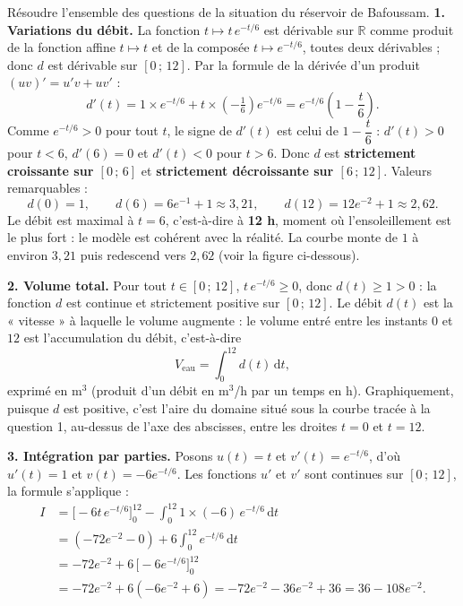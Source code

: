 \documentclass[11pt]{article}
\begin{document}
\begin{exoresolu}
Résoudre l'ensemble des questions de la situation du réservoir de Bafoussam.
\tcblower
\textbf{1. Variations du débit.} La fonction $t \mapsto t\,e^{-t/6}$ est dérivable sur $\mathbb{R}$ comme produit de la fonction affine $t \mapsto t$ et de la composée $t \mapsto e^{-t/6}$, toutes deux dérivables ; donc $d$ est dérivable sur $[0\,;\,12]$. Par la formule de la dérivée d'un produit $(uv)' = u'v + uv'$ :
\[ d'(t) = 1 \times e^{-t/6} + t \times \left(-\tfrac{1}{6}\right)e^{-t/6} = e^{-t/6}\left(1 - \frac{t}{6}\right). \]
Comme $e^{-t/6} > 0$ pour tout $t$, le signe de $d'(t)$ est celui de $1 - \dfrac{t}{6}$ : $d'(t) > 0$ pour $t < 6$, $d'(6) = 0$ et $d'(t) < 0$ pour $t > 6$. Donc $d$ est \textbf{strictement croissante sur $[0\,;\,6]$} et \textbf{strictement décroissante sur $[6\,;\,12]$}. Valeurs remarquables :
\[ d(0) = 1, \qquad d(6) = 6e^{-1} + 1 \approx 3{,}21, \qquad d(12) = 12e^{-2} + 1 \approx 2{,}62. \]
Le débit est maximal à $t = 6$, c'est-à-dire à \textbf{12 h}, moment où l'ensoleillement est le plus fort : le modèle est cohérent avec la réalité. La courbe monte de $1$ à environ $3{,}21$ puis redescend vers $2{,}62$ (voir la figure ci-dessous).

\textbf{2. Volume total.} Pour tout $t \in [0\,;\,12]$, $t\,e^{-t/6} \geq 0$, donc $d(t) \geq 1 > 0$ : la fonction $d$ est continue et strictement positive sur $[0\,;\,12]$. Le débit $d(t)$ est la « vitesse » à laquelle le volume augmente : le volume entré entre les instants $0$ et $12$ est l'accumulation du débit, c'est-à-dire
\[ V_{\text{eau}} = \int_0^{12} d(t)\,\mathrm{d}t, \]
exprimé en m$^3$ (produit d'un débit en m$^3$/h par un temps en h). Graphiquement, puisque $d$ est positive, c'est l'aire du domaine situé sous la courbe tracée à la question 1, au-dessus de l'axe des abscisses, entre les droites $t = 0$ et $t = 12$.

\textbf{3. Intégration par parties.} Posons $u(t) = t$ et $v'(t) = e^{-t/6}$, d'où $u'(t) = 1$ et $v(t) = -6e^{-t/6}$. Les fonctions $u'$ et $v'$ sont continues sur $[0\,;\,12]$, la formule s'applique :
\begin{align*}
I &= \Big[ -6t\,e^{-t/6} \Big]_0^{12} - \int_0^{12} 1 \times (-6)\,e^{-t/6}\,\mathrm{d}t \\
&= \left( -72e^{-2} - 0 \right) + 6 \int_0^{12} e^{-t/6}\,\mathrm{d}t \\
&= -72e^{-2} + 6\,\Big[ -6e^{-t/6} \Big]_0^{12} \\
&= -72e^{-2} + 6\left(-6e^{-2} + 6\right) = -72e^{-2} - 36e^{-2} + 36 = 36 - 108e^{-2}.
\end{align*}


\end{exoresolu}
\end{document}
